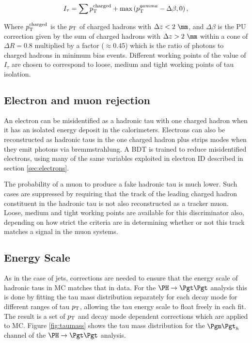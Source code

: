 \begin{equation}
I_{\tau} = \sum p_{\mathrm{T}}^{\text{charged}} + \max \left( p_{\mathrm{T}}^{gamma} - \Delta \beta,
0 \right) , 
\label{eq:tauIsolation}
\end{equation}

Where $p_{\mathrm{T}}^{\text{charged}}$ is the $p_{\mathrm{T}}$ of charged hadrons with $\Delta z < 2~\mm$, and
$\Delta \beta$ is the \ac{PU} correction given by the sum of charged hadrons with $\Delta
z > 2~\mm$ within a cone of $\Delta R = 0.8$ multiplied by a factor ($\approx$0.45) which is the
ratio of photons to charged hadrons in minimum bias events. Different working
points of the value of $I_{\tau}$ are chosen to correspond to loose, medium and
tight working points of tau isolation.

\subsection{Electron and muon rejection}
\label{sec:tauleptonrejection}

An electron can be misidentified as a hadronic tau with one charged hadron when
it has an isolated energy deposit in the calorimeters. Electrons can also be
reconstructed as hadronic taus in the one charged hadron plus strips modes when 
they emit photons via bremmstrahlung. A \ac{BDT} is trained to reduce
misidentified electrons, using many of the same variables exploited in electron
ID described in section \ref{sec:electrons}. 

The probability of a muon to produce a fake hadronic tau is much lower. Such
cases are suppressed by requiring that the track of the leading charged hadron
constituent in the hadronic tau is not also reconstructed as a tracker muon.
Loose, medium and tight working points are available for this discriminator
also, depending on how strict the criteria are in determining whether or not
this track matches a signal in the muon systems. 

\subsection{Energy Scale}
\label{sec:taues}

As in the case of jets, corrections are needed to ensure that the energy scale
of hadronic taus in \ac{MC} matches that in data. For the $\PH \to \Pgt\Pgt$
analysis this is done by fitting the tau mass distribution separately for each
decay mode for different ranges of tau $p_{\mathrm{T}}$, allowing the tau energy scale to
float freely in each fit. The result is a set of $p_{\mathrm{T}}$ and decay mode dependent
corrections which are applied to MC. Figure \ref{fig:taumass} shows the tau
mass distribution for the $\mutau$ channel of the $\PH\to\Pgt\Pgt$ analysis. 

